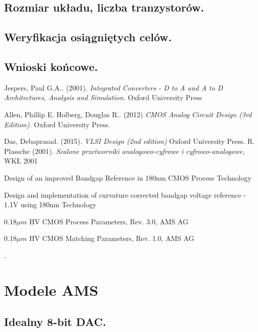 \documentclass[10pt,a4paper]{report}
\theoremstyle{definition}
\theoremstyle{definition}
\theoremstyle{definition}
\theoremstyle{definition}
\theoremstyle{definition}
\begin{document}
{	\section{Rozmiar układu, liczba tranzystorów.}
	\section{Weryfikacja osiągniętych celów.}
	\section{Wnioski końcowe.}	


\begin{thebibliography}{9}
	Jespers, Paul G.A.. (2001). 
	\textit{Integrated Converters - D to A and A to D Architectures, Analysis and Simulation.}
	Oxford University Press
	
	Allen, Phillip E. Holberg, Douglas R.. (2012)  
	\textit{CMOS Analog Circuit Design (3rd Edition). }
	Oxford University Press.
	
	Das, Debaprasad. (2015).
	\textit{VLSI Design (2nd edition)}
	Oxford University Press.
	R. Plassche (2001). 
	\textit{Scalone przetworniki analogowo-cyfrowe i cyfrowo-analogowe,}
	WKŁ 2001
	
	Design of an improved Bandgap Reference in
	180nm CMOS Process Technology
	
	Design and implementation of curvature corrected
	bandgap voltage reference - 1.1V using 180nm Technology
	
	$0.18\mu m$ HV CMOS Process Parameters, Rev. 3.0, AMS AG
	
	$0.18\mu m$ HV CMOS Matching Parameters, Rev. 1.0, AMS AG
	
\end{thebibliography}
	\listoffigures

	\listoftables

	\appendix
.	\chapter{Modele AMS}
	\section{Idealny 8-bit DAC.}
}
\end{document}

